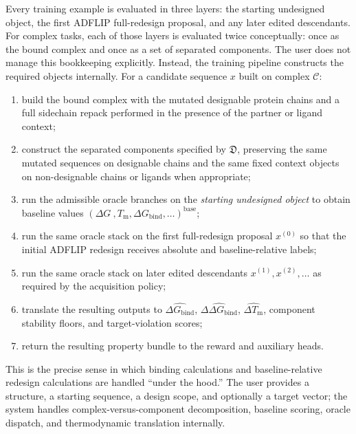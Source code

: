 \documentclass[11pt]{article}
\newcommand{\dG}{\ensuremath{\Delta G \ }}
\newcommand{\Tm}{\ensuremath{T_{\mathrm m}}}
\newcommand{\DGbind}{\ensuremath{\Delta G_{\mathrm{bind}}}}
\newcommand{\ddGbind}{\ensuremath{\Delta\Delta G_{\mathrm{bind}}}}
\newcommand{\dGbind}{\ensuremath{\Delta G_{\mathrm{bind}}}}
\newcommand{\Cx}{\mathcal{C}}
\begin{document}
Every training example is evaluated in three layers: the starting undesigned object, the first ADFLIP full-redesign proposal, and any later edited descendants. For complex tasks, each of those layers is evaluated twice conceptually: once as the bound complex and once as a set of separated components. The user does not manage this bookkeeping explicitly. Instead, the training pipeline constructs the required objects internally. For a candidate sequence $x$ built on complex $\Cx$:
\begin{enumerate}[leftmargin=1.5em]
    \item build the bound complex with the mutated designable protein chains and a full sidechain repack performed in the presence of the partner or ligand context;
    \item construct the separated components specified by $\mathfrak{D}$, preserving the same mutated sequences on designable chains and the same fixed context objects on non-designable chains or ligands when appropriate;
    \item run the admissible oracle branches on the \emph{starting undesigned object} to obtain baseline values $(\dG,\Tm,\DGbind,\ldots)^{\mathrm{base}}$;
    \item run the same oracle stack on the first full-redesign proposal $x^{(0)}$ so that the initial ADFLIP redesign receives absolute and baseline-relative labels;
    \item run the same oracle stack on later edited descendants $x^{(1)},x^{(2)},\ldots$ as required by the acquisition policy;
    \item translate the resulting outputs to $\widehat{\dGbind}$, $\widehat{\ddGbind}$, $\widehat{\Delta \Tm}$, component stability floors, and target-violation scores;
    \item return the resulting property bundle to the reward and auxiliary heads.
\end{enumerate}
This is the precise sense in which binding calculations and baseline-relative redesign calculations are handled ``under the hood.'' The user provides a structure, a starting sequence, a design scope, and optionally a target vector; the system handles complex-versus-component decomposition, baseline scoring, oracle dispatch, and thermodynamic translation internally.
\end{document}
